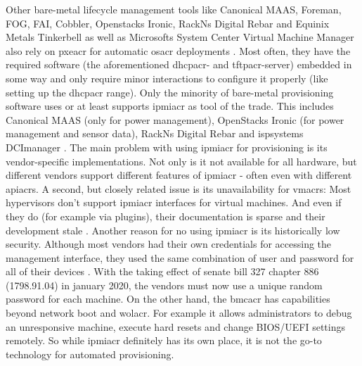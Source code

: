 \newline
Other bare-metal lifecycle management tools like Canonical MAAS, Foreman, FOG, FAI, Cobbler, Openstacks Ironic, RackNs Digital Rebar and Equinix Metals Tinkerbell as well as Microsofts System Center Virtual Machine Manager also rely on \gls{pxeacr} for automatic \gls{osacr} deployments \cite{maas_how_it_works} \cite{foreman_what_is} \cite{fog_introduction} \cite{fai_how_does_it_work} \cite{cobbler_documentation} \cite{openstack_ironic_docs} \cite{rackn_what_is_digital_rebar} \cite{tinkerbell_architecture} \cite{microsoft_provision_hyperv_bare_metal}. Most often, they have the required software (the aforementioned \gls{dhcpacr}- and \gls{tftpacr}-server) embedded in some way and only require minor interactions to configure it properly (like setting up the \gls{dhcpacr} range).
\newline
Only the minority of bare-metal provisioning software uses or at least supports \gls{ipmiacr} as tool of the trade. This includes Canonical MAAS (only for power management), OpenStacks Ironic (for power management and sensor data), RackNs Digital Rebar and ispsystems DCImanager \cite{maas_snap_power_management} \cite{openstack_ironic_docs} \cite{rackn_what_is_digital_rebar} \cite{ispsystem_dcimanager}.
The main problem with using \gls{ipmiacr} for provisioning is its vendor-specific implementations. Not only is it not available for all hardware, but different vendors support different features of \gls{ipmiacr} - often even with different \gls{apiacr}s. A second, but closely related issue is its unavailability for \gls{vmacr}s: Most hypervisors don't support \gls{ipmiacr} interfaces for virtual machines. And even if they do (for example via plugins), their documentation is sparse and their development stale \cite{openstack_virtualbmc}.
\newline
Another reason for no using \gls{ipmiacr} is its historically low security. Although most vendors had their own credentials for accessing the management interface, they used the same combination of user and password for all of their devices \cite{bmc_default_passwords}. With the taking effect of senate bill 327 chapter 886 (1798.91.04) in january 2020, the vendors must now use a unique random password for each machine.
\newline
On the other hand, the \gls{bmcacr} has capabilities beyond network boot and \gls{wolacr}. For example it allows administrators to debug an unresponsive machine, execute hard resets and change BIOS/UEFI settings remotely.
So while \gls{ipmiacr} definitely has its own place, it is not the go-to technology for automated provisioning.
